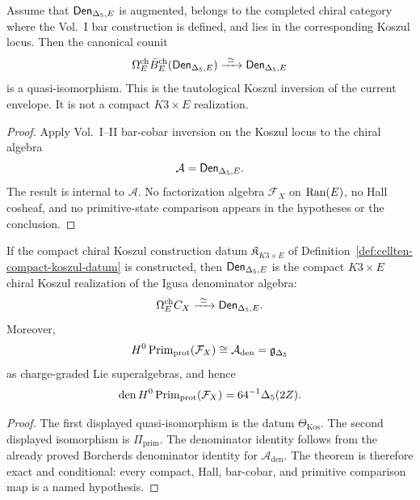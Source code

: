 \begin{proposition}
\label{prop:cellten-tautological-koszul}
Assume that \(\mathsf{Den}_{\Delta_5,E}\) is augmented, belongs to the
completed chiral category where the Vol.~I bar construction is defined,
and lies in the corresponding Koszul locus.  Then the canonical counit
$$
\Omega^{\mathrm{ch}}_E\bar B_E^{\mathrm{ch}}(\mathsf{Den}_{\Delta_5,E})
\xrightarrow{\ \simeq\ }
\mathsf{Den}_{\Delta_5,E}
$$
is a quasi-isomorphism.  This is the tautological Koszul inversion of
the current envelope.  It is not a compact \(K3\times E\) realization.
\end{proposition}

\begin{proof}
Apply Vol.~I--II bar-cobar inversion on the Koszul locus to the chiral
algebra
$$
\mathcal A=\mathsf{Den}_{\Delta_5,E}.
$$
The result is internal to \(\mathcal A\).  No factorization algebra
\(\mathcal F_X\) on \(\operatorname{Ran}(E)\), no Hall cosheaf, and no primitive-state
comparison appears in the hypotheses or the conclusion.
\end{proof}

\begin{theorem}
\label{thm:cellten-sharp-conditional}
If the compact chiral Koszul construction datum
\(\mathfrak K_{K3\times E}\) of
Definition~\ref{def:cellten-compact-koszul-datum} is constructed, then
\(\mathsf{Den}_{\Delta_5,E}\) is the compact \(K3\times E\) chiral Koszul
realization of the Igusa denominator algebra:
$$
\Omega^{\mathrm{ch}}_E C_X
\xrightarrow{\ \simeq\ }
\mathsf{Den}_{\Delta_5,E}.
$$
Moreover,
$$
H^0\operatorname{Prim}_{\mathrm{prot}}(\mathcal F_X)
\cong
\mathcal A_{\mathrm{den}}
=\mathfrak g_{\Delta_5}
$$
as charge-graded Lie superalgebras, and hence
$$
\operatorname{den}
H^0\operatorname{Prim}_{\mathrm{prot}}(\mathcal F_X)
=64^{-1}\Delta_5(2Z).
$$
\end{theorem}

\begin{proof}
The first displayed quasi-isomorphism is the datum
\(\Theta_{\mathrm{Kos}}\).  The second displayed isomorphism is
\(\Pi_{\mathrm{prim}}\).  The denominator identity follows from the
already proved Borcherds denominator identity for
\(\mathcal A_{\mathrm{den}}\).  The theorem is therefore exact and
conditional: every compact, Hall, bar-cobar, and primitive comparison
map is a named hypothesis.
\end{proof}

